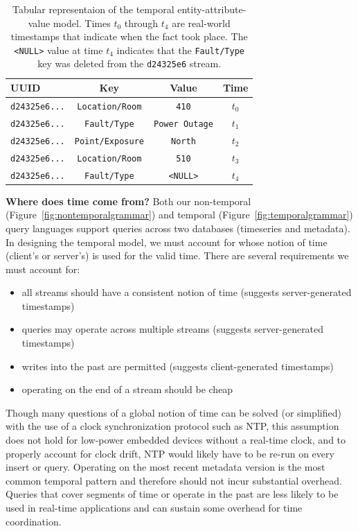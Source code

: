 \begin{table}
\centering
\begin{tabular}{|l|c|c|c|}
\hline
\textbf{UUID} & \textbf{Key} & \textbf{Value} & \textbf{Time} \\
\hline
\texttt{d24325e6...} & \texttt{Location/Room} & \texttt{410} & $t_0$ \\
\texttt{d24325e6...} & \texttt{Fault/Type} & \texttt{Power Outage} & $t_1$ \\
\texttt{d24325e6...} & \texttt{Point/Exposure} & \texttt{North} & $t_2$ \\
\texttt{d24325e6...} & \texttt{Location/Room} & \texttt{510} & $t_3$ \\
\texttt{d24325e6...} & \texttt{Fault/Type} & \texttt{<NULL>} & $t_4$ \\
\hline
\end{tabular}
\caption{Tabular representaion of the temporal entity-attribute-value model. Times $t_0$ through $t_4$ are real-world timestamps
that indicate when the fact took place. The \texttt{<NULL>} value at time $t_4$ indicates that the \texttt{Fault/Type} key was deleted
from the \texttt{d24325e6} stream.}
\label{table:temporaleavexample}
\end{table}

\textbf{Where does time come from?}
Both our non-temporal (Figure~\ref{fig:nontemporalgrammar}) and temporal
(Figure~\ref{fig:temporalgrammar}) query languages support queries across two
databases (timeseries and metadata). In designing the temporal model, we must
account for whose notion of time (client's or server's) is used for the valid
time. There are several requirements we must account for:

\begin{itemize}
\item all streams should have a consistent notion of time (suggests server-generated timestamps)
\item queries may operate across multiple streams (suggests server-generated timestamps)
\item writes into the past are permitted (suggests client-generated timestamps)
\item operating on the end of a stream should be cheap
\end{itemize}

Though many questions of a global notion of time can be solved (or simplified)
with the use of a clock synchronization protocol such as NTP, this assumption
does not hold for low-power embedded devices without a real-time clock, and to
properly account for clock drift, NTP would likely have to be re-run on every
insert or query. Operating on the most recent metadata version is the most
common temporal pattern and therefore should not incur substantial overhead.
Queries that cover segments of time or operate in the past are less likely to
be used in real-time applications and can sustain some overhead for time
coordination.


